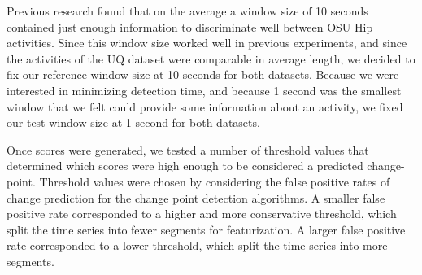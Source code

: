 Previous research \cite{zheng12} found that on the average a window size of 10
seconds contained just enough information to discriminate well between OSU Hip activities.
Since this window size worked well in previous experiments, and since the 
activities of the UQ dataset were comparable in average length, we decided to
fix our reference window size at 10 seconds for both datasets. Because we were interested in
minimizing detection time, and because 1 second was the smallest window that
we felt could provide some information about an activity, we fixed our test
window size at 1 second for both datasets.

Once scores were generated, we tested a number of threshold values that determined which
scores were high enough to be considered a predicted change-point.
Threshold values were chosen by considering the false positive rates of
change prediction for the change point detection algorithms. A smaller false positive rate
corresponded to a higher and more conservative threshold, which split the
time series into fewer segments for featurization. A larger false positive rate
corresponded to a lower threshold, which split the time series into more segments.
